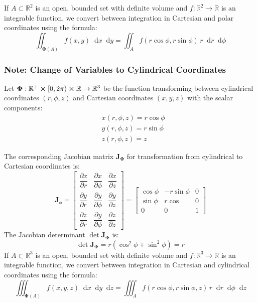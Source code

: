 \documentclass[11pt, a4paper]{article}
\newcommand{\diff}{\mathop{}\!\mathrm{d}} %
\begin{document}
If $ A \subset \mathbb{R}^2 $ is an open, bounded set with definite volume and $ f : \mathbb{R}^2 \rightarrow \mathbb{R}  $ is an integrable function, we convert between integration in Cartesian and polar coordinates using the formula:
\begin{equation*}
	\iint_{\bm{\Phi}(A)} f(x, y) \diff x \diff y = \iint_{A}f(r \cos \phi, r \sin \phi)\, r \diff r \diff \phi
\end{equation*}


\subsubsection{Note: Change of Variables to Cylindrical Coordinates}
Let $ \bm{\Phi} : \mathbb{R}^+ \cross [0, 2\pi) \cross \mathbb{R} \rightarrow \mathbb{R}^3 $ be the function transforming between cylindrical coordinates $ (r, \phi, z) $ and Cartesian coordinates $ (x, y, z) $ with the scalar components:
\begin{align*}
	& x(r, \phi, z) = r \cos \phi\\
	& y(r, \phi, z) = r \sin \phi \\
	& z(r, \phi, z) = z
\end{align*}

The corresponding Jacobian matrix $ \mathbf{J}_{\bm{\Phi}} $ for transformation from cylindrical to Cartesian coordinates is:
\[
\mathbf{J}_{\phi} = 
\begin{bmatrix}
	\dfrac{\partial x}{\partial r} & \dfrac{\partial x}{\partial \phi} & \dfrac{\partial x}{\partial z}\\[2.0ex]
	\dfrac{\partial y}{\partial r} & \dfrac{\partial y}{\partial \phi} & \dfrac{\partial y}{\partial z} \\[2.0ex]
	\dfrac{\partial z}{\partial r} & \dfrac{\partial y}{\partial \phi} & \dfrac{\partial z}{\partial z}
	\end{bmatrix} = 
	\begin{bmatrix}
	\cos \phi & - r \sin \phi  & 0 \\[1.5ex]
 \sin \phi & r \cos & 0  \\[1.5ex]
	0 & 0 & 1
\end{bmatrix}
\]
The Jacobian determinant $ \det \mathbf{J}_{\bm{\Phi}} $ is:
\begin{equation*}
\det \mathbf{J}_{\bm{\Phi}} = r(\cos^2\phi + \sin^2 \phi) = r
\end{equation*}
If $ A \subset \mathbb{R}^3 $ is an open, bounded set with definite volume and $ f : \mathbb{R}^3 \rightarrow \mathbb{R}  $ is an integrable function, we convert between integration in Cartesian and cylindrical coordinates using the formula:
\begin{equation*}
	\iiint_{\bm{\Phi}(A)} f(x, y, z) \diff x \diff y \diff z = \iiint_{A}f\left(r \cos \phi, r \sin \phi, z \right)\, r \diff r \diff \phi \diff z
\end{equation*}
\end{document}
